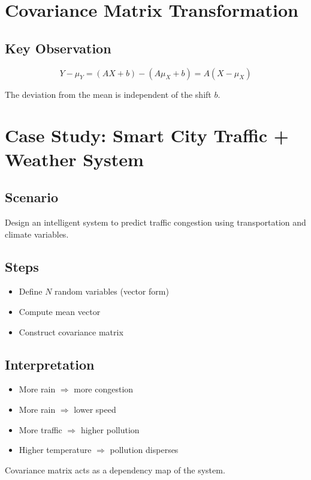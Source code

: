 \documentclass[12pt]{article}
\begin{document}
\section{Covariance Matrix Transformation}

\subsection{Key Observation}
\[
Y - \mu_Y = (AX + b) - (A\mu_X + b) = A(X - \mu_X)
\]

The deviation from the mean is independent of the shift $b$.

\section{Case Study: Smart City Traffic + Weather System}

\subsection{Scenario}
Design an intelligent system to predict traffic congestion using transportation and climate variables.

\subsection{Steps}
\begin{itemize}
\item Define $N$ random variables (vector form)
\item Compute mean vector
\item Construct covariance matrix
\end{itemize}

\subsection{Interpretation}
\begin{itemize}
\item More rain $\Rightarrow$ more congestion
\item More rain $\Rightarrow$ lower speed
\item More traffic $\Rightarrow$ higher pollution
\item Higher temperature $\Rightarrow$ pollution disperses
\end{itemize}

Covariance matrix acts as a dependency map of the system.
\end{document}
